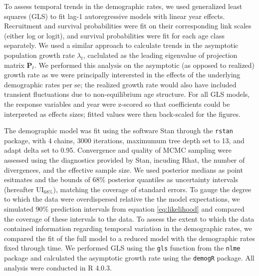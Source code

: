 To assess temporal trends in the demographic rates, 
we used generalized least squares  (GLS) to fit lag-1 autoregressive models
with linear year effects.
Recruitment and survival probabilities were fit on their corresponding link scales 
(either log or logit),
and survival probabilities were fit for each age class separately.
We used a similar approach to calculate trends in the asymptotic population growth rate
$\lambda_t$, caclulated as the leading eigenvalue of projection matrix $\mathbf{P}_{t}$.
We performed this analysis on the asymptotic (as opposed to realized) growth rate 
as we were principally interersted in the effects 
of the underlying demographic rates per se; 
the realized growth rate would also have included transient fluctuations due to
non-equilibrium age structure.
For all GLS models, the response variables and year were z-scored so that coefficients
could be interpreted as effects sizes;
fitted values were then back-scaled for the figures.

The demographic model was fit using the software Stan through the \texttt{rstan} package,
with 4 chains, 3000 iterations, maximumum tree depth set to 13, and adapt delta set to 0.95.
Convergence and quality of MCMC sampling were assessed using the diagnostics provided by Stan, 
incuding Rhat, the number of divergences, and the effective sample size.
We used posterior medians as point esitmates 
and the bounds of 68\% posterior quantiles as uncertainty intervals 
(hereafter $\text{UI}_{68\%}$), 
matching the coverage of standard errors.
To gauge the degree to which the data were overdispersed relative 
the the model expectations, 
we simulated 90\% prediction intervals from equation \ref{eq:likelihood} 
and compared the coverage of these intervals to the data.
To assess the extent to which the data contained information regarding temporal variation 
in the demographic rates,
we compared the fit of the full model to a reduced model with the demographic
rates fixed through time.
We performed GLS using the \texttt{gls} function from the \texttt{nlme} package 
and calculated the asymptotic growth rate using the \texttt{demogR} package.
All analysis were conducted in R 4.0.3. 


